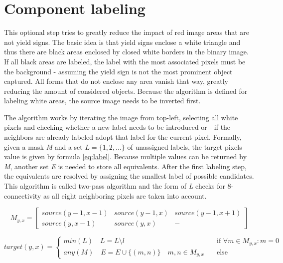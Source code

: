 \documentclass{report}
\begin{document}
{\color{red}{Picture examples}}


\section{Component labeling}

This optional step tries to greatly reduce the impact of red image
areas that are not yield signs. The basic idea is that yield signs
enclose a white triangle and thus there are black areas enclosed by
closed white borders in the binary image. If all black areas are
labeled, the label with the most associated pixels must be the
background - assuming the yield sign is not the most prominent object
captured. All forms that do not enclose any area vanish that way,
greatly reducing the amount of considered objects. Because the
algorithm is defined for labeling white areas, the source image needs
to be inverted first.

The algorithm works by iterating the image from top-left, selecting
all white pixels and checking whether a new label needs to be
introduced or - if the neighbors are already labeled adopt that label
for the current pixel. Formally, given a mask \textit{M} and a set \(
L = \{1, 2, ... \} \) of unassigned labels, the target pixels value is
given by formula \ref{eq:label}. Because multiple values can be
returned by \textit{M}, another set \textit{E} is needed to store all
equivalents. After the first labeling step, the equivalents are
resolved by assigning the smallest label of possible candidates. This
algorithm is called two-pass algorithm and the form of \textit{L}
checks for 8-connectivity as all eight neighboring pixels are taken
into account.

\begin{equation}
  M_{y, x} = \begin{bmatrix}
    source(y-1, x-1) & source(y-1, x) & source(y-1, x+1) \\
    source(y, x-1)   & source(y, x)   & -
  \end{bmatrix}
\end{equation}


\begin{equation}\label{eq:label}
    target(y, x) =
    \begin{cases}
      min(L) \quad L = L \setminus l & \quad \text{if } \forall m \in M_{y, x}: m = 0 \\
      any(M) \quad E = E \cup \{(m, n)\} \quad m, n \in M_{y, x} & \quad \text{else}
    \end{cases}
\end{equation}
\end{document}
